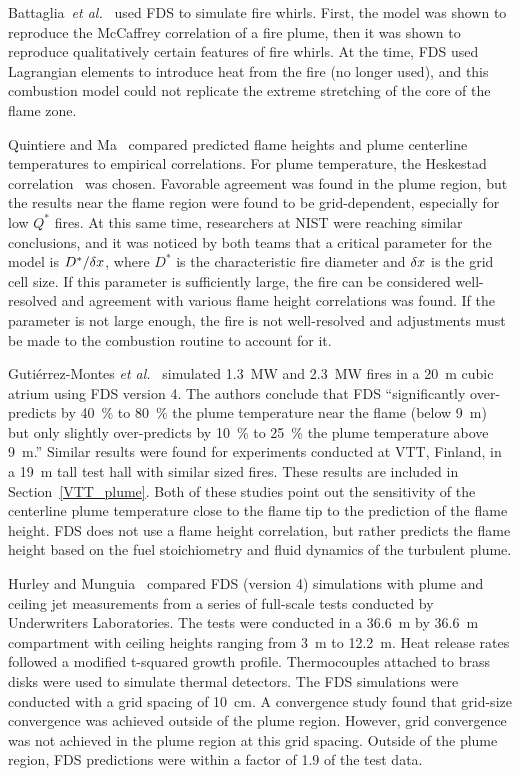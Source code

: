 Battaglia~{\em  et al.}~\cite{Battaglia:1} used  FDS to  simulate fire whirls.   First,  the  model  was  shown to  reproduce  the  McCaffrey
correlation  of  a  fire  plume,   then  it  was  shown  to  reproduce qualitatively certain features  of fire whirls. At the  time, FDS used
Lagrangian elements to introduce heat  from the fire (no longer used), and this  combustion model could not replicate  the extreme stretching of the
core of the flame zone.

Quintiere and Ma~\cite{Ma:2,Ma:3} compared predicted flame heights and plume  centerline temperatures to  empirical correlations.   For plume
temperature,   the  Heskestad   correlation~\cite{SFPE:Heskestad}  was chosen.  Favorable  agreement was found  in the plume region,  but the results
near  the  flame  region  were found  to  be  grid-dependent, especially for  low $Q^*$  fires.  At this  same time,  researchers at NIST were
reaching similar  conclusions, and it  was noticed  by both teams  that a  critical parameter  for the  model is  $D^*/\delta x$, where $D^*$ is the
characteristic fire diameter and $\delta x$  is the grid cell size.  If  this parameter  is  sufficiently  large,  the fire  can  be considered
well-resolved  and  agreement  with various  flame  height correlations was found. If the parameter is not large enough, the fire is not
well-resolved and adjustments  must be made to  the combustion routine to account for it.

Guti\'{e}rrez-Montes {\em et al.}~\cite{Gutierrez:Building_and_Environment} simulated 1.3~MW and 2.3~MW fires in a 20~m cubic atrium using FDS version 4.
The authors conclude that FDS ``significantly
over-predicts by 40~\% to 80~\% the plume temperature near the flame (below 9~m) but only slightly over-predicts by 10~\% to 25~\% the
plume temperature above 9~m.'' Similar results were found for experiments conducted at VTT, Finland, in a 19~m tall test hall with similar sized fires. These results
are included in Section~\ref{VTT_plume}. Both of these studies point out the sensitivity of the centerline plume temperature close to the flame tip to the prediction of the
flame height. FDS does not use a flame height correlation, but rather predicts the flame height based on the fuel stoichiometry and fluid dynamics of the turbulent plume.

Hurley and Munguia~\cite{Hurley:GCR09-921,Hurley:JFPE2009} compared FDS (version 4) simulations with plume and ceiling
jet measurements from a series of full-scale tests
conducted by Underwriters Laboratories. The tests were conducted in a 36.6~m by 36.6~m
compartment with ceiling heights ranging from 3~m to 12.2~m. Heat release rates
followed a modified t-squared growth profile. Thermocouples attached to brass disks were used to
simulate thermal detectors.
The FDS simulations were conducted with a grid spacing of 10~cm. A convergence study found
that grid-size convergence was achieved outside of the plume region. However, grid
convergence was not achieved in the plume region at this grid spacing. Outside of the plume
region, FDS predictions were within a factor of 1.9 of the test data.



